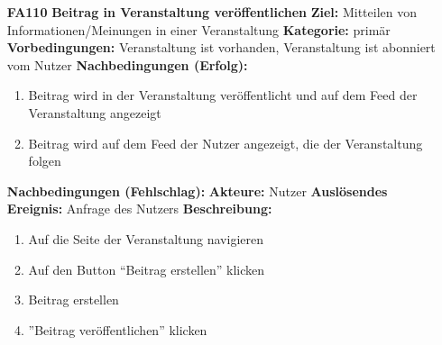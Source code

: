 \documentclass[parskip=full]{scrartcl}
\begin{document}
\begin{itemize}[nosep]
								
			\item[\textbf{FA110}]\textbf{Beitrag in Veranstaltung veröffentlichen}
				\newline \textbf{Ziel:} Mitteilen von Informationen/Meinungen in einer Veranstaltung
				\newline \textbf{Kategorie:} primär
				\newline \textbf{Vorbedingungen:} Veranstaltung ist vorhanden, Veranstaltung ist abonniert vom Nutzer
				\newline \textbf{Nachbedingungen (Erfolg):} 
				\begin{enumerate}[nosep]
					\item Beitrag wird in der Veranstaltung veröffentlicht und auf dem Feed der Veranstaltung angezeigt
					\item Beitrag wird auf dem Feed der Nutzer angezeigt, die der Veranstaltung folgen
				\end{enumerate}
				\textbf{Nachbedingungen (Fehlschlag):}
				\newline \textbf{Akteure:} Nutzer
				\newline \textbf{Auslösendes Ereignis:} Anfrage des Nutzers
				\newline \textbf{Beschreibung:}
				\begin{enumerate}[nosep]
					\item Auf die Seite der Veranstaltung navigieren
					\item Auf den Button “Beitrag erstellen” klicken
					\item Beitrag erstellen
					\item ”Beitrag veröffentlichen” klicken\\
				\end{enumerate}
			

\end{itemize}
\end{document}
